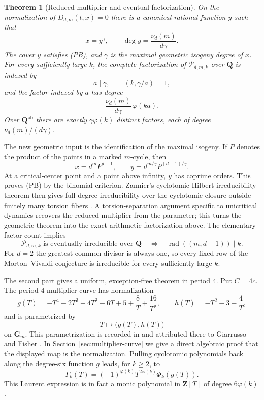 \documentclass[11pt]{article}
\newtheorem{theorem}{Theorem}[section]
\newcommand{\Q}{\mathbf Q}
\newcommand{\Z}{\mathbf Z}
\begin{document}
\begin{theorem}[Reduced multiplier and eventual factorization]
\label{thm:intro-unicritical}
On the normalization of $D_{d,m}(t,x)=0$ there is a canonical rational
function $y$ such that
\[
 x=y^\gamma,\qquad
 \deg y=\frac{\nu_d(m)}{d\gamma}.
\]
The cover $y$ satisfies \emph{(PB)}, and $\gamma$ is the maximal geometric
isogeny degree of $x$.  For every sufficiently large $k$, the complete
factorization of $\mathcal P_{d,m,k}$ over $\Q$ is indexed by
\[
 a\mid\gamma,\qquad (k,\gamma/a)=1,
\]
and the factor indexed by $a$ has degree
\[
 \frac{\nu_d(m)}{d\gamma}\,\varphi(ka).
\]
Over $\Q^{\mathrm{ab}}$ there are exactly $\gamma\varphi(k)$ distinct
factors, each of degree $\nu_d(m)/(d\gamma)$.
\end{theorem}

The new geometric input is the identification of the maximal isogeny.
If $P$ denotes the product of the points in a marked $m$-cycle, then
\[
 x=d^mP^{d-1},\qquad
 y=d^{m/\gamma}P^{(d-1)/\gamma}.
\]
At a critical-center point and a point above infinity, $y$ has coprime
orders.  This proves (PB) by the binomial criterion.  Zannier's cyclotomic
Hilbert
irreducibility theorem then gives full-degree irreducibility over the
cyclotomic closure outside finitely many torsion fibers
\cite[Theorem 2.1]{Zannier2010}.  A torsion-separation argument specific
to unicritical dynamics recovers the reduced multiplier from the
parameter; this turns the geometric theorem into the exact arithmetic
factorization above.  The elementary factor count implies
\[
 \mathcal P_{d,m,k}\text{ is eventually irreducible over }\Q
 \quad\Longleftrightarrow\quad
 \operatorname{rad}((m,d-1))\mid k.
\]
For $d=2$ the greatest common divisor is always one, so every fixed row
of the Morton--Vivaldi conjecture is irreducible for every sufficiently
large $k$.

The second part gives a uniform, exception-free theorem in period $4$.
Put $C=4c$.  The period-$4$ multiplier curve has normalization
\[
 g(T)=-T^4-2T^3-4T^2-6T+5+\frac8T+\frac{16}{T^2},
 \qquad
 h(T)=-T^2-3-\frac4T,
\]
and is parametrized by
\begin{equation}\label{eq:parametrization}
 T\longmapsto \bigl(g(T),h(T)\bigr)
\end{equation}
on $\mathbf G_m$.  This parametrization is recorded in
\cite[Remark 2.10]{KoizumiMurakamiSanoTakehira2025} and attributed there
to Giarrusso and Fisher \cite{GiarrussoFisher1995}.  In
Section~\ref{sec:multiplier-curve} we give a direct algebraic proof that
the displayed map is the normalization.  Pulling cyclotomic polynomials
back along the degree-six function $g$ leads, for $k\ge2$, to
\[
 \Gamma_k(T)=(-1)^{\varphi(k)}T^{2\varphi(k)}\Phi_k(g(T)).
\]
This Laurent expression is in fact a monic polynomial in $\Z[T]$ of
degree $6\varphi(k)$.
\end{document}
